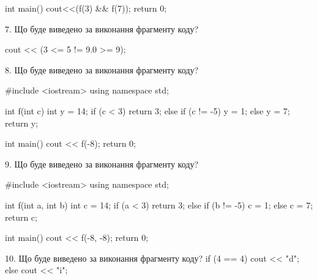 \documentclass[11pt, ukrainian]{article}
\begin{document}
\begin{large}
int main(){
    cout<<(f(3) && f(7));
    return 0;
}


7. Що буде виведено за виконання фрагменту коду?

cout << (3 <= 5 != 9.0 >= 9);


8. Що буде виведено за виконання фрагменту коду?

#include <iostream>
using namespace std;

int f(int c){
    int y = 14;
    if (c < 3) 
        return 3;
    else if (c != -5)
         y = 1;
    else
         y = 7;
    return y;
}

int main(){
    cout << f(-8);
    return 0;
}



9. Що буде виведено за виконання фрагменту коду?

#include <iostream>
using namespace std;

int f(int a, int b){
    int c = 14;
    if (a < 3)
        return 3;
    else if (b != -5)
         c = 1;
    else 
        c = 7;
    return c;
}

int main(){
    cout << f(-8, -8);
    return 0;
}


10. Що буде виведено за виконання фрагменту коду?
if (4 == 4)
    cout << "d";
else
    cout << "i";


\end{large}
\vspace{20mm}
\end{document}
